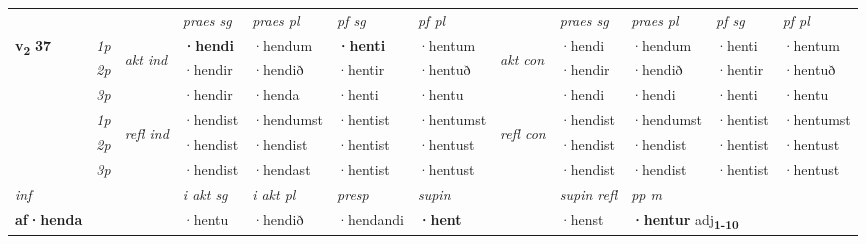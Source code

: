 \begin{longtable}[l]{X>{\footnotesize\itshape}llXXXXlXXXX}
 & &   & \textit{praes sg}  & \textit{praes pl}    & \textit{ pf sg} & \textit{pf pl} & & \textit{praes sg}  & \textit{praes pl}    & \textit{pf sg} & \textit{pf pl }  \\ \cmidrule{4-7} \cmidrule{9-12}
 \multirow{2}{*}{{{\textbf{v{\textsubscript{2}}} \Large{\textbf{37}}}}}  & 1p & \multirow{3}{*}{\begin{turn}{90}\textit{akt ind}\end{turn}} & \textbf{·hendi} & ·hendum & \textbf{·henti} & ·hentum & \multirow{3}{*}{\begin{turn}{90}\textit{akt con}\end{turn}} &·hendi & ·hendum & ·henti & ·hentum\\*
 & 2p &  &  ·hendir  & ·hendið & ·hentir & ·hentuð & & ·hendir & ·hendið & ·hentir & ·hentuð \\*
 & 3p &  & ·hendir & ·henda & ·henti & ·hentu & & ·hendi & ·hendi& ·henti & ·hentu \\*
\cmidrule{4-7} \cmidrule{9-12}
 & 1p & \multirow{3}{*}{\begin{turn}{90}\textit{refl ind}\end{turn}}  & ·hendist & ·hendumst & ·hentist & ·hentumst & \multirow{3}{*}{\begin{turn}{90}\textit{refl con}\end{turn}}  &·hendist & ·hendumst & ·hentist & ·hentumst \\*
 & 2p &  & ·hendist & ·hendist & ·hentist & ·hentust & &·hendist & ·hendist & ·hentist & ·hentust \\*
 & 3p  & & ·hendist & ·hendast & ·hentist & ·hentust & & ·hendist & ·hendist& ·hentist & ·hentust \\*
\cmidrule{4-7} \cmidrule{9-12}

   {\textit{inf}} & &  & \textit{i akt sg} & \textit{i akt pl}   & \textit{presp} & \textit{supin} && \textit{supin refl} & \textit{pp m} \\*
  {\textbf{af\allowbreak ·henda}} & && ·hentu  & ·hendið   & ·hendandi &  \textbf{·hent} && ·henst & \multicolumn{2}{l}{\textbf{·hentur} adj\textbf{\textsubscript{1-10}}} \\*

\midrule


\end{longtable}
